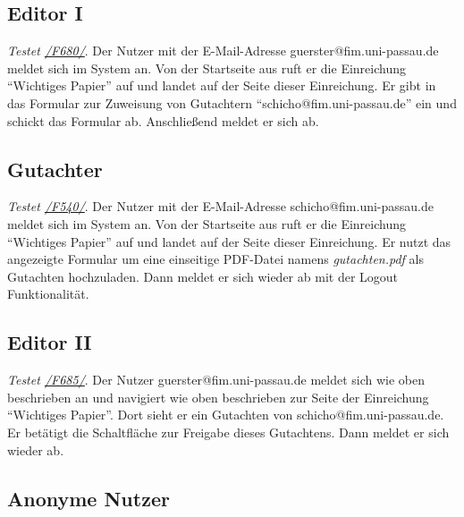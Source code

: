 \subsection{Editor I}
\begin{description}

	 \emph{Testet \hyperref[funkt:680]{/F680/}}.
	Der Nutzer mit der E-Mail-Adresse guerster@fim.uni-passau.de meldet sich im System an.
	Von der Startseite aus ruft er die Einreichung ``Wichtiges Papier'' auf und landet auf der Seite dieser Einreichung.
	Er gibt in das Formular zur Zuweisung von Gutachtern ``schicho@fim.uni-passau.de'' ein und schickt das Formular ab.
	Anschließend meldet er sich ab.

\end{description}

\subsection{Gutachter}
\begin{description}

	 \emph{Testet \hyperref[funkt:540]{/F540/}}.
	Der Nutzer mit der E-Mail-Adresse schicho@fim.uni-passau.de meldet sich im System an.
	Von der Startseite aus ruft er die Einreichung ``Wichtiges Papier'' auf und landet auf der Seite dieser Einreichung.
	Er nutzt das angezeigte Formular um eine einseitige PDF-Datei namens \emph{gutachten.pdf} als Gutachten hochzuladen.
	Dann meldet er sich wieder ab mit der Logout Funktionalität.

\end{description}

\subsection{Editor II}
\begin{description}

	 \emph{Testet \hyperref[funkt:685]{/F685/}}.
	Der Nutzer guerster@fim.uni-passau.de meldet sich wie oben beschrieben an und navigiert wie oben beschrieben zur Seite der Einreichung ``Wichtiges Papier''.
	Dort sieht er ein Gutachten von schicho@fim.uni-passau.de.
	Er betätigt die Schaltfläche zur Freigabe dieses Gutachtens.
	Dann meldet er sich wieder ab.

\end{description}

\subsection{Anonyme Nutzer}

